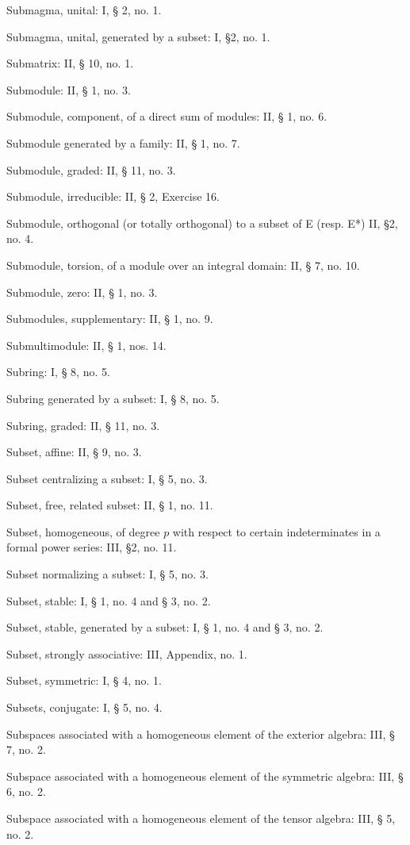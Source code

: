 Submagma, unital: I, § 2, no. 1.

Submagma, unital, generated by a subset: I, §2, no. 1.

Submatrix: II, § 10, no. 1.

Submodule: II, § 1, no. 3.

Submodule, component, of a direct sum of modules: II, § 1, no. 6.

Submodule generated by a family: II, § 1, no. 7.

Submodule, graded: II, § 11, no. 3.

Submodule, irreducible: II, § 2, Exercise 16.

Submodule, orthogonal (or totally orthogonal) to a subset of E (resp. E*) II, §2, no. 4.

Submodule, torsion, of a module over an integral domain: II, § 7, no. 10.

Submodule, zero: II, § 1, no. 3.

Submodules, supplementary: II, § 1, no. 9.

Submultimodule: II, § 1, nos. 14.

Subring: I, § 8, no. 5.

Subring generated by a subset: I, § 8, no. 5.

Subring, graded: II, § 11, no. 3.

Subset, affine: II, § 9, no. 3.

Subset centralizing a subset: I, § 5, no. 3.

Subset, free, related subset: II, § 1, no. 11.

Subset, homogeneous, of degree \(p\) with respect to certain indeterminates in a formal power series: III, §2, no. 11.

Subset normalizing a subset: I, § 5, no. 3.

Subset, stable: I, § 1, no. 4 and § 3, no. 2.

Subset, stable, generated by a subset: I, § 1, no. 4 and § 3, no. 2.

Subset, strongly associative: III, Appendix, no. 1.

Subset, symmetric: I, § 4, no. 1.

Subsets, conjugate: I, § 5, no. 4.

Subspaces associated with a homogeneous element of the exterior algebra: III, § 7, no. 2.

Subspace associated with a homogeneous element of the symmetric algebra: III, § 6, no. 2.

Subspace associated with a homogeneous element of the tensor algebra: III, § 5, no. 2.

